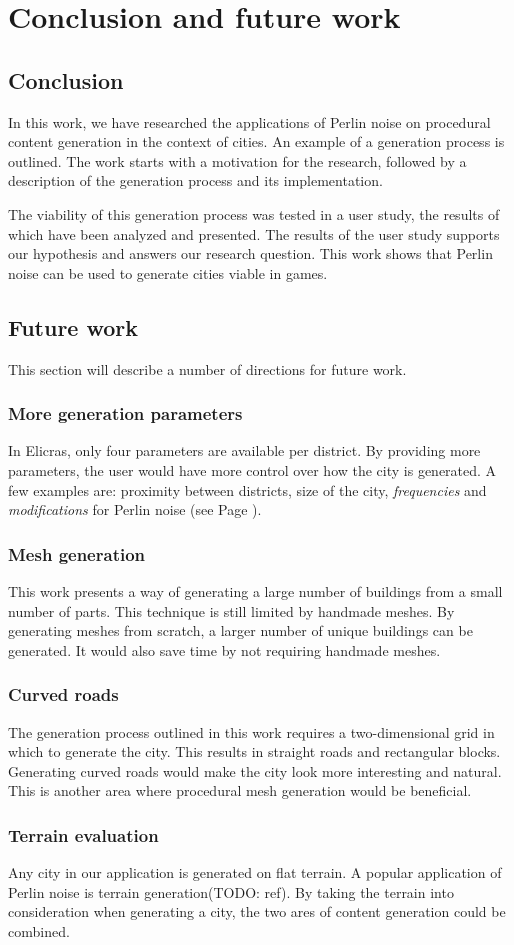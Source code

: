 \section{Conclusion and future work}
	\subsection{Conclusion}
	In this work, we have researched the applications of Perlin noise on procedural content generation in the context of cities. An example of a generation process is outlined. The work starts with a motivation for the research, followed by a description of the generation process and its implementation.
	
	\par
	The viability of this generation process was tested in a user study, the results of which have been analyzed and presented. The results of the user study supports our hypothesis and answers our research question. This work shows that Perlin noise can be used to generate cities viable in games.

	\subsection{Future work}
	This section will describe a number of directions for future work.
	
		\subsubsection{More generation parameters}
		In Elicras, only four parameters are available per district. By providing more parameters, the user would have more control over how the city is generated. A few examples are: proximity between districts, size of the city, \textit{frequencies} and \textit{modifications} for Perlin noise (see Page \pageref{fig:normal-and-modified-perlin}).
	
		\subsubsection{Mesh generation}
		This work presents a way of generating a large number of buildings from a small number of parts. This technique is still limited by handmade meshes. By generating meshes from scratch, a larger number of unique buildings can be generated. It would also save time by not requiring handmade meshes.
		
		\subsubsection{Curved roads}
		The generation process outlined in this work requires a two-dimensional grid in which to generate the city. This results in straight roads and rectangular blocks. Generating curved roads would make the city look more interesting and natural. This is another area where procedural mesh generation would be beneficial.
		
		\subsubsection{Terrain evaluation}
		Any city in our application is generated on flat terrain. A popular application of Perlin noise is terrain generation(TODO: ref). By taking the terrain into consideration when generating a city, the two ares of content generation could be combined.
